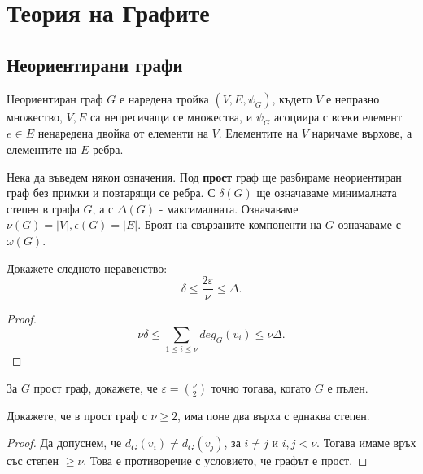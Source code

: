 \chapter{Теория на Графите}

\section{Неориентирани графи}

\begin{dfn}
  Неориентиран граф $G$ е наредена тройка $(V,E,\psi_G)$, където
  $V$ е непразно множество, $V,E$ са непресичащи се множества, и $\psi_G$ асоциира с всеки елемент $e\in E$
  ненаредена двойка от елементи на $V$.
  Елементите на $V$ наричаме върхове, а елементите на $E$ ребра.
\end{dfn}

Нека да въведем някои означения.
Под {\bf прост} граф ще разбираме неориентиран граф без примки и повтарящи се ребра.
С $\delta(G)$ ще означаваме минималната степен в графа $G$, а с $\Delta(G)$ - максималната.
Означаваме $\nu(G) = |V|, \epsilon(G) = |E|$.
Броят на свързаните компоненти на $G$ означаваме с $\omega(G)$.

\begin{problem}
  Докажете следното неравенство:
  \[\delta \leq \frac{2\varepsilon}{\nu} \leq \Delta.\]
\end{problem}
\begin{proof}
  \[\nu\delta \leq\sum_{1\leq i \leq\nu} deg_G(v_i) \leq \nu\Delta.\]
\end{proof}

\begin{problem}
  За $G$ прост граф, докажете, че $\varepsilon = \binom{\nu}{2}$ точно тогава, когато $G$ е пълен.
\end{problem}
  
  
\begin{problem}
  Докажете, че в прост граф с $\nu\geq 2$, има поне два върха с еднаква степен.
\end{problem}
\begin{proof}
  Да допуснем, че $d_G(v_i)\neq d_G(v_j)$, за $i\neq j$ и $i,j < \nu$.
  Тогава имаме връх със степен $\geq \nu$. Това е противоречие с условието, че графът е прост.
\end{proof}

